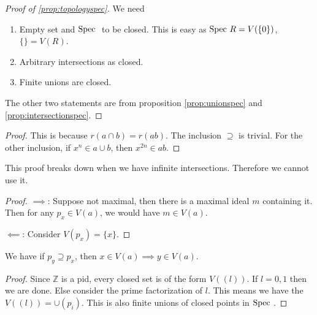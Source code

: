\begin{proof}[Proof of \ref{prop:topologyspec}]
    We need \begin{enumerate}
        \item Empty set and $\textrm{Spec }$ to be closed. This is easy as $\textrm{Spec } R = V(\{0\})$, $\{\}=V(R)$.
        \item Arbitrary intersections as closed.
        \item Finite unions are closed.
    \end{enumerate}

    The other two statements are from proposition \ref{prop:unionspec} and \ref{prop:intersectionspec}.
\end{proof}
\proposition[]{
\[
V(ab) = V(a\cap b).
\]
}
\begin{proof}
    This is because $r(a\cap b) = r(ab)$.
    The inclusion $\supseteq$ is trivial.
    For the other inclusion, if $x^n\in a\cup b$, then $x^{2n}\in ab$.
\end{proof}
\begin{remark}
    This proof breaks down when we have infinite intersections. Therefore we cannot use it.
\end{remark}
\begin{proof}
    $\implies$: Suppose not maximal, then there is a maximal ideal $m$ containing it. Then for any $p_x\in V(a)$, we would have $m\in V(a)$.

    $\impliedby$: Consider $V(p_x)=\{x\}$.
\end{proof}
\begin{remark}
    We have if $p_y\supseteq p_x$, then $x\in V(a)\implies y\in V(a)$.
\end{remark}
\begin{proof}
    Since $\mathbb{Z}$ is a pid, every closed set is of the form $V((l))$.
    If $l=0,1$ then we are done. Else consider the prime factorization of $l$. This means we have the $V((l))=\cup (p_i)$. This is also finite unions of closed points in $\textrm{Spec }$.
\end{proof}

